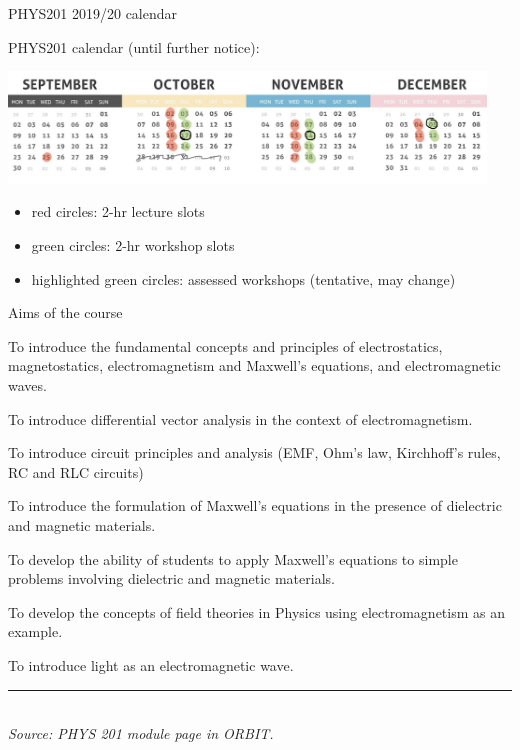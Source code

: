 %
%
%

\begin{frame}{PHYS201 2019/20 calendar}

PHYS201 calendar (until further notice):\\
  \begin{center}
    \includegraphics[width=0.95\textwidth]{./images/year_specific/phys201_calendar_201920_v1.png}\\
  \end{center}

\begin{itemize}
  \item red circles: 2-hr lecture slots
  \item green circles: 2-hr workshop slots
  \item highlighted green circles: assessed workshops (tentative, may change)
\end{itemize}

\end{frame}

%
%
%

\begin{frame}{Aims of the course}

\begin{itemize}
{\small
\item
To introduce the fundamental concepts and principles of electrostatics, magnetostatics,
electromagnetism and Maxwell's equations, and electromagnetic waves.
\item
To introduce differential vector analysis in the context of electromagnetism.
\item
To introduce circuit principles and analysis (EMF, Ohm's law, Kirchhoff's rules, RC and RLC circuits)
\item
To introduce the formulation of Maxwell's equations in the presence of dielectric and magnetic materials.
\item
To develop the ability of students to apply Maxwell's equations to simple problems involving dielectric and
magnetic materials.
\item
To develop the concepts of field theories in Physics using electromagnetism as an example.
\item
To introduce light as an electromagnetic wave.
}
\end{itemize}

\vspace{0.2cm}
\noindent\rule{2cm}{0.4pt}\\
{\it \scriptsize Source: PHYS 201 module page in ORBIT.}

\end{frame}

